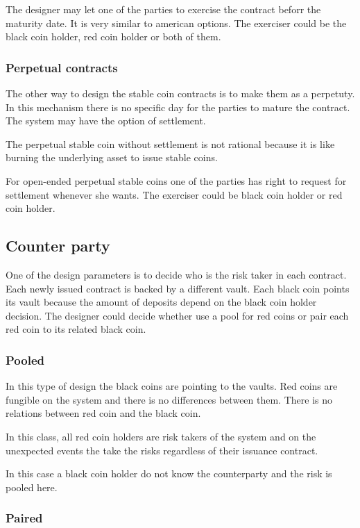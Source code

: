 \documentclass[runningheads]{llncs}
\begin{document}
The designer may let one of the parties to exercise the contract beforr the maturity date. It is very similar to american options. The exerciser could be the black coin holder, red coin holder or both of them. 

\subsubsection{Perpetual contracts}
The other way to design the stable coin contracts is to make them as a perpetuty. In this mechanism there is no specific day for the parties to mature the contract. The system may have the option of settlement.

The perpetual stable coin without settlement is not rational because it is like burning the underlying asset to issue stable coins. 

For open-ended perpetual stable coins one of the parties has right to request for settlement whenever she wants. The exerciser could be black coin holder or red coin holder.
\subsection{Counter party}
One of the design parameters is to decide who is the risk taker in each contract. Each newly issued contract is backed by a different vault. Each black coin points its vault because the amount of deposits depend on the black coin holder decision. 
The designer could decide whether use a pool for red coins or pair each red coin to its related black coin.

\subsubsection{Pooled}

In this type of design the black coins are pointing to the vaults. Red coins are fungible on the system and there is no differences between them. There is no relations between red coin and the black coin. 

In this class, all red coin holders are risk takers of the system and on the unexpected events the take the risks regardless of their issuance contract.

In this case a black coin holder do not know the counterparty and the risk is pooled here.

\subsubsection{Paired}
\end{document}
